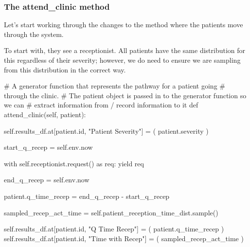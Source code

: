 \documentclass[
  letterpaper,
  DIV=11,
  numbers=noendperiod]{scrreprt}
\newenvironment{Shaded}{}{}
\newcommand{\BuiltInTok}[1]{\textcolor[rgb]{0.84,0.23,0.29}{#1}}
\newcommand{\CommentTok}[1]{\textcolor[rgb]{0.42,0.45,0.49}{#1}}
\newcommand{\ControlFlowTok}[1]{\textcolor[rgb]{0.84,0.23,0.29}{#1}}
\newcommand{\ImportTok}[1]{\textcolor[rgb]{0.01,0.18,0.38}{#1}}
\newcommand{\KeywordTok}[1]{\textcolor[rgb]{0.84,0.23,0.29}{#1}}
\newcommand{\NormalTok}[1]{\textcolor[rgb]{0.14,0.16,0.18}{#1}}
\newcommand{\OperatorTok}[1]{\textcolor[rgb]{0.14,0.16,0.18}{#1}}
\newcommand{\StringTok}[1]{\textcolor[rgb]{0.01,0.18,0.38}{#1}}
\newcommand{\VariableTok}[1]{\textcolor[rgb]{0.89,0.38,0.04}{#1}}
\newcommand*\circled[1]{\tikz[baseline=(char.base)]{
          \node[shape=circle,draw,inner sep=1pt] (char) {{\scriptsize#1}};}}
\begin{document}
\subsubsection{The attend\_clinic
method}\label{the-attend_clinic-method-2}

Let's start working through the changes to the method where the patients
move through the system.

To start with, they see a receptionist. All patients have the same
distribution for this regardless of their severity; however, we do need
to ensure we are sampling from this distribution in the correct way.

\label{annotated-cell-75}%
\begin{Shaded}
\begin{Highlighting}[]
    \CommentTok{\# A generator function that represents the pathway for a patient going}
    \CommentTok{\# through the clinic.}
    \CommentTok{\# The patient object is passed in to the generator function so we can}
    \CommentTok{\# extract information from / record information to it}
    \KeywordTok{def}\NormalTok{ attend\_clinic(}\VariableTok{self}\NormalTok{, patient):}

        \VariableTok{self}\NormalTok{.results\_df.at[patient.}\BuiltInTok{id}\NormalTok{, }\StringTok{"Patient Severity"}\NormalTok{] }\OperatorTok{=}\NormalTok{ ( }\hspace*{\fill}\NormalTok{\circled{1}}
\NormalTok{                 patient.severity}
\NormalTok{            )}

\NormalTok{        start\_q\_recep }\OperatorTok{=} \VariableTok{self}\NormalTok{.env.now}

        \ControlFlowTok{with} \VariableTok{self}\NormalTok{.receptionist.request() }\ImportTok{as}\NormalTok{ req:}
            \ControlFlowTok{yield}\NormalTok{ req}

\NormalTok{            end\_q\_recep }\OperatorTok{=} \VariableTok{self}\NormalTok{.env.now}

\NormalTok{            patient.q\_time\_recep }\OperatorTok{=}\NormalTok{ end\_q\_recep }\OperatorTok{{-}}\NormalTok{ start\_q\_recep}

\NormalTok{            sampled\_recep\_act\_time }\OperatorTok{=} \VariableTok{self}\NormalTok{.patient\_reception\_time\_dist.sample() }\hspace*{\fill}\NormalTok{\circled{2}}

            \VariableTok{self}\NormalTok{.results\_df.at[patient.}\BuiltInTok{id}\NormalTok{, }\StringTok{"Q Time Recep"}\NormalTok{] }\OperatorTok{=}\NormalTok{ (}
\NormalTok{                 patient.q\_time\_recep}
\NormalTok{            )}
            \VariableTok{self}\NormalTok{.results\_df.at[patient.}\BuiltInTok{id}\NormalTok{, }\StringTok{"Time with Recep"}\NormalTok{] }\OperatorTok{=}\NormalTok{ (}
\NormalTok{                 sampled\_recep\_act\_time}
\NormalTok{            )}


\end{Highlighting}
\end{Shaded}
\end{document}
